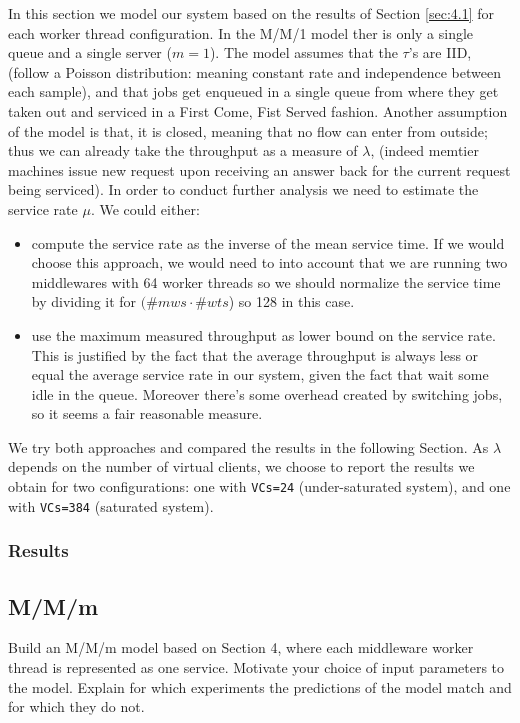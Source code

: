 \documentclass[11pt,a4paper]{article}
\begin{document}
In this section we model our system based on the results of Section \ref{sec:4.1} for each worker thread configuration.
In the M/M/1 model ther is only a single queue and a single server ($m=1$). The model assumes that the $\tau$'s are IID, (follow a Poisson distribution: meaning constant rate and independence between each sample), and that jobs get enqueued in a single queue from where they get taken out and serviced in a First Come, Fist Served fashion. Another assumption of the model is that, it is closed, meaning that no flow can enter from outside; thus we can already take the throughput as a measure of $\lambda$, (indeed memtier machines issue new request upon receiving an answer back for the current request being serviced). 
In order to conduct further analysis we need to estimate the service rate $\mu$. We could either:
\begin{itemize}
    \item compute the service rate as the inverse of the mean service time. If we would choose this approach, we would need to into account that we are running two middlewares with 64 worker threads so we should normalize the service time by dividing it for $(\#mws \cdot \#wts$) so 128 in this case.
    \item use the maximum measured throughput as lower bound on the service rate. This is justified by the fact that the average throughput is always less or equal the average service rate in our system, given the fact that wait some idle in the queue. Moreover there's some overhead created by switching jobs, so it seems a fair reasonable measure.
\end{itemize}
We try both approaches and compared the results in the following Section.
As $\lambda$ depends on the number of virtual clients, we choose to report the results we obtain for two configurations: one with \texttt{VCs=24} (under-saturated system), and one with \texttt{VCs=384} (saturated system). 

\subsubsection*{Results}

\subsection{M/M/m}

Build an M/M/m model based on Section 4, where each middleware worker thread is represented as one service.  Motivate your choice of input parameters to the model. Explain for which experiments the predictions of the model match and for which they do not.
\end{document}

